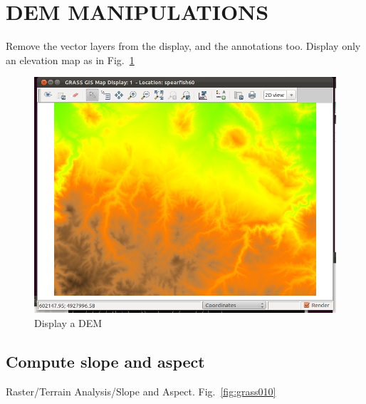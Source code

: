 \section{DEM MANIPULATIONS}
Remove the vector layers from the display, and the annotations too. Display only an elevation map as in Fig.~\ref{fig:grass009}

\begin{figure}[htbp]
   \centering
   \includegraphics[scale=0.35]{grass009.png}
   \caption{Display a DEM}
   \label{fig:grass009}
\end{figure}

\subsection{Compute slope and aspect}
Raster/Terrain Analysis/Slope and Aspect. Fig.~\ref{fig:grass010}

